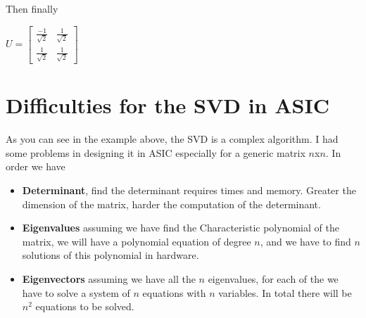Then finally 

\begin{center}
	$ U=\begin{bmatrix}
	\frac{-1}{\sqrt{2}} & \frac{1}{\sqrt{2}}\\
	\frac{1}{\sqrt{2}} & \frac{1}{\sqrt{2}}
	\end{bmatrix} $
\end{center}
\section{Difficulties for the SVD in ASIC}
As you can see in the example above, the SVD is a complex algorithm. I had some problems in designing it in ASIC especially for a generic matrix $ n$x$n $.
In order we have
\begin{itemize}
	\item \textbf{Determinant}, find the determinant requires times and memory. Greater the dimension of the matrix, harder the computation of the determinant.
	\item \textbf{Eigenvalues} assuming we have find the Characteristic polynomial of the matrix, we will have a polynomial equation of degree $ n $, and we have to find $ n $ solutions of this polynomial in hardware.
	\item \textbf{Eigenvectors} assuming we have all the $ n $ eigenvalues, for each of the we have to solve a system of $n$ equations with $n$ variables. In total there will be $n^2$ equations to be solved.
\end{itemize}
